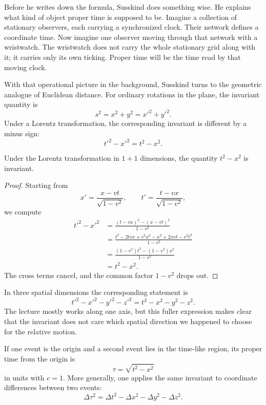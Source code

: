 Before he writes down the formula, Susskind does something wise. He explains what kind of object proper time is supposed to be. Imagine a collection of stationary observers, each carrying a synchronized clock. Their network defines a coordinate time. Now imagine one observer moving through that network with a wristwatch. The wristwatch does not carry the whole stationary grid along with it; it carries only its own ticking. Proper time will be the time read by that moving clock.

With that operational picture in the background, Susskind turns to the geometric analogue of Euclidean distance. For ordinary rotations in the plane, the invariant quantity is
\begin{equation}
s^2=x^2+y^2=x'^2+y'^2.
\end{equation}
Under a Lorentz transformation, the corresponding invariant is different by a minus sign:
\begin{equation}
t'^2-x'^2=t^2-x^2.
\end{equation}

\begin{proposition}
Under the Lorentz transformation in \(1+1\) dimensions, the quantity \(t^2-x^2\) is invariant.
\end{proposition}

\begin{proof}
Starting from
\begin{equation}
x'=\frac{x-vt}{\sqrt{1-v^2}},
\qquad
t'=\frac{t-vx}{\sqrt{1-v^2}},
\end{equation}
we compute
\begin{align}
t'^2-x'^2
&= \frac{(t-vx)^2-(x-vt)^2}{1-v^2} \\
&= \frac{t^2-2tvx+v^2x^2-x^2+2xvt-v^2t^2}{1-v^2} \\
&= \frac{(1-v^2)t^2-(1-v^2)x^2}{1-v^2} \\
&= t^2-x^2.
\end{align}
The cross terms cancel, and the common factor \(1-v^2\) drops out.
\end{proof}

In three spatial dimensions the corresponding statement is
\begin{equation}
t'^2-x'^2-y'^2-z'^2=t^2-x^2-y^2-z^2.
\end{equation}
The lecture mostly works along one axis, but this fuller expression makes clear that the invariant does not care which spatial direction we happened to choose for the relative motion.

\begin{definition}
If one event is the origin and a second event lies in the time-like region, its proper time from the origin is
\begin{equation}
\tau=\sqrt{t^2-x^2}
\end{equation}
in units with \(c=1\). More generally, one applies the same invariant to coordinate differences between two events:
\begin{equation}
\Delta \tau^2=\Delta t^2-\Delta x^2-\Delta y^2-\Delta z^2.
\end{equation}
\end{definition}

